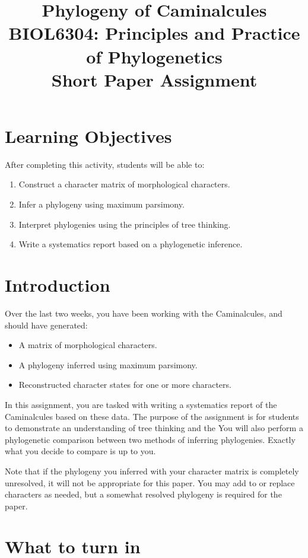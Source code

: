 \documentclass[12pt]{article}
\title{Phylogeny of Caminalcules\\ \large BIOL6304: Principles and Practice of Phylogenetics \\ Short Paper Assignment }
\begin{document}
\maketitle

\section{Learning Objectives}

After completing this activity, students will be able to:

\begin{enumerate}
\item Construct a character matrix of morphological characters.
\item Infer a phylogeny using maximum parsimony.
\item Interpret phylogenies using the principles of tree thinking.
\item Write a systematics report based on a phylogenetic inference.
\end{enumerate}

\section{Introduction}

Over the last two weeks, you have been working with the Caminalcules, and should have generated:
\begin{itemize}
\item A matrix of morphological characters.
\item A phylogeny inferred using maximum parsimony.
\item Reconstructed character states for one or more characters.
\end{itemize}

In this assignment, you are tasked with writing a systematics report of the Caminalcules based on these data. 
The purpose of the assignment is for students to demonstrate an understanding of tree thinking and the 
You will also perform a phylogenetic comparison between two methods of inferring phylogenies.
Exactly what you decide to compare is up to you.

Note that if the phylogeny you inferred with your character matrix is completely unresolved, it will not be appropriate for this paper. 
You may add to or replace characters as needed, but a somewhat resolved phylogeny is required for the paper.

\section{What to turn in}
\end{document}
